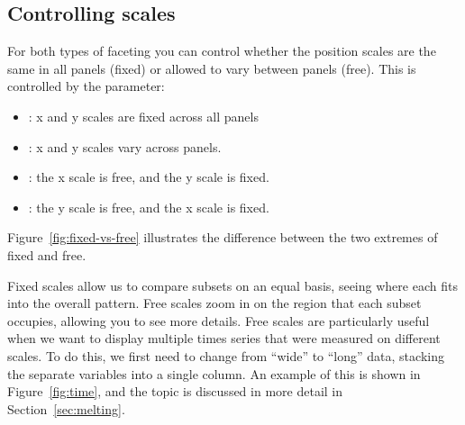 \subsection{Controlling scales}
\label{sub:controlling_scales}

For both types of faceting you can control whether the position scales are the same in all panels (fixed) or allowed to vary between panels (free).  This is controlled by the  parameter:

\begin{itemize}
  \item {}: x and y scales are fixed across all panels
  \item {}: x and y scales vary across panels.
  \item {}: the x scale is free, and the y scale is fixed.
  \item {}: the y scale is free, and the x scale is fixed.
\end{itemize}

\noindent Figure~\ref{fig:fixed-vs-free} illustrates the difference between the two extremes of fixed and free.

% 


Fixed scales allow us to compare subsets on an equal basis, seeing where each fits into the overall pattern.  Free scales zoom in on the region that each subset occupies, allowing you to see more details. Free scales are particularly useful when we want to display multiple times series that were measured on different scales.  To do this, we first need to change from ``wide'' to ``long'' data, stacking the separate variables into a single column.  An example of this is shown in Figure~\ref{fig:time}, and the topic is discussed in more detail in Section~\ref{sec:melting}.  

% 


